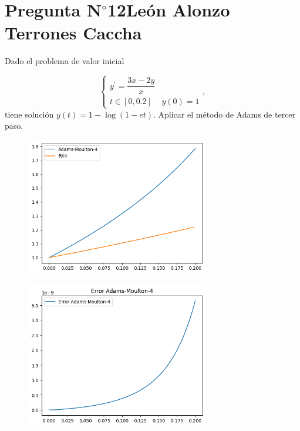 \section{Pregunta N$^{\circ}$12\qquad León Alonzo Terrones Caccha}

\begin{frame}
    
Dado el problema de valor inicial

              \begin{equation}
                  \begin{cases}
                      y^\prime =\dfrac{3x-2y}{x}
                       & \\
                      t\in [0,0.2]
                       & y\left(0\right)=1
                  \end{cases},
              \end{equation}
tiene solución $y(t)=1-\log(1-et)$. Aplicar el método de Adams de tercer paso.
              

    \begin{solution}

    \begin{figure}
        \centering
        \includegraphics[width=8cm]{p12-Comparar-results.png}
        \label{fig:enter-label}
    \end{figure}
    \end{solution}
\end{frame}
\begin{frame}{}
    \begin{figure}
        \centering
        \includegraphics[width=8cm]{p12-Error-AM.png}
        \label{fig:enter-label}
    \end{figure}
\end{frame}

